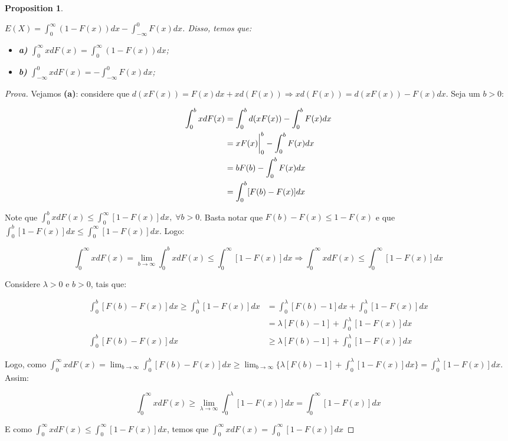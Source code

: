 \documentclass[
]{article}
\providecommand{\tightlist}{%
  \setlength{\itemsep}{0pt}\setlength{\parskip}{0pt}}
\newtheorem{proposition}{Proposition}[section]
\theoremstyle{definition}
\theoremstyle{definition}
\theoremstyle{definition}
\theoremstyle{definition}
\theoremstyle{remark}
\begin{document}
\begin{proposition}
\protect\hypertarget{prp:separespe}{}\label{prp:separespe}

\(E(X) = \int_{0}^{\infty}(1 - F(x))dx - \int_{-\infty}^{0}F(x)dx\). Disso, temos que:

\begin{itemize}
\tightlist
\item
  \textbf{a)} \(\int_{0}^{\infty}xdF(x) = \int_{0}^{\infty}(1 - F(x))dx\);
\item
  \textbf{b)} \(\int_{-\infty}^{0}xdF(x) = - \int_{-\infty}^{0}F(x)dx\);
\end{itemize}

\end{proposition}

\begin{proof}[Prova]
Vejamos \textbf{(a)}: considere que \(d(xF(x)) = F(x)dx + xd(F(x)) \Rightarrow xd(F(x)) = d(xF(x)) - F(x)dx\). Seja um \(b > 0\):

\begin{align*}
\int_{0}^{b}xdF(x) &= \int_{0}^{b}d(xF(x)) - \int_{0}^{b}F(x)dx \\
&= xF(x)\bigg{|}_{0}^{b} - \int_{0}^{b}F(x)dx \\
&= bF(b) - \int_{0}^{b}F(x)dx \\
&= \int_{0}^{b}[F(b) - F(x)]dx
\end{align*}

Note que \(\int_{0}^{b}xdF(x) \le \int_{0}^{\infty}[1 - F(x)]dx, \; \forall b>0\). Basta notar que \(F(b) - F(x) \le 1 - F(x)\) e que \(\int_{0}^{b}[1 - F(x)]dx \le \int_{0}^{\infty}[1 - F(x)]dx\). Logo:

\begin{equation*}
\int_{0}^{\infty}xdF(x) = \lim_{b \to \infty}\int_{0}^{b}xdF(x) \le \int_{0}^{\infty}[1 - F(x)]dx \Rightarrow \int_{0}^{\infty}xdF(x) \le \int_{0}^{\infty}[1 - F(x)]dx
\end{equation*}

Considere \(\lambda > 0\) e \(b > 0\), tais que:

\begin{align*}
\int_{0}^{b}[F(b) - F(x)]dx \ge \int_{0}^{\lambda}[1 - F(x)]dx &= \int_{0}^{\lambda}[F(b) - 1]dx + \int_{0}^{\lambda}[1 - F(x)]dx \\
&= \lambda[F(b) - 1] + \int_{0}^{\lambda}[1 - F(x)]dx \\
\int_{0}^{b}[F(b) - F(x)]dx &\ge \lambda[F(b) - 1] + \int_{0}^{\lambda}[1 - F(x)]dx
\end{align*}

Logo, como \(\int_{0}^{\infty}xdF(x) = \lim_{b \to \infty}\int_{0}^{b}[F(b) - F(x)]dx \ge \lim_{b \to \infty}\{\lambda[F(b) - 1] + \int_{0}^{\lambda}[1 - F(x)]dx\} = \int_{0}^{\lambda}[1 - F(x)]dx\). Assim:

\begin{equation*}
\int_{0}^{\infty}xdF(x) \ge \lim_{\lambda \to \infty}\int_{0}^{\lambda}[1 - F(x)]dx = \int_{0}^{\infty}[1 - F(x)]dx
\end{equation*}

E como \(\int_{0}^{\infty}xdF(x) \le \int_{0}^{\infty}[1 - F(x)]dx\), temos que \(\int_{0}^{\infty}xdF(x) = \int_{0}^{\infty}[1 - F(x)]dx\)
\end{proof}
\end{document}
